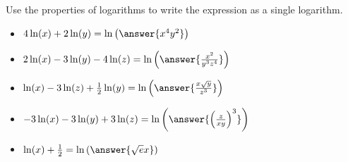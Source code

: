 \documentclass{ximera}
\author{Carl Stitz \and Jeff Zeager \and Bart Snapp \and Matthew Carr}
\begin{document}
\begin{exercise}
Use the properties of logarithms to write the expression as a single
logarithm. 

\begin{itemize}
\item $4\ln(x) + 2\ln(y)=\ln\left(\answer{x^4y^2}\right)$ 
\item $2 \ln(x) -3 \ln(y) - 4\ln(z)=\ln\left(\answer{\frac{x^2}{y^3z^4}}\right)$
\item $\ln(x) - 3 \ln(z) + \frac{1}{2} \ln(y)=\ln\left(\answer{\frac{x\sqrt{y}}{z^{3}}}\right)$
\item $-3\ln(x) -3\ln(y) + 3 \ln(z)=\ln\left(\answer{\Bigl(\frac{z}{xy}\Bigr)^{3}}\right)$
\item $\ln(x) + \frac{1}{2}=\ln\left(\answer{\sqrt{e}x}\right)$  
\end{itemize}

\end{exercise}
\end{document}
